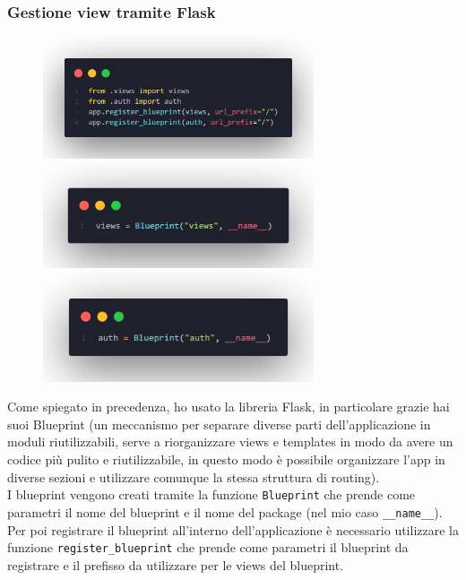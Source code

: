 \documentclass[12pt]{article}
\def\code#1{\texttt{#1}}
\begin{document}
\newpage

\subsubsection{Gestione view tramite Flask}

\begin{figure}
    \begin{minipage}{\linewidth}
        \includegraphics[width=8cm]{blueprints.png}
        \includegraphics[width=8cm]{bp-views.png}
        \includegraphics[width=8cm]{bp-auth.png}
    \end{minipage}
\end{figure}
\justifying
Come spiegato in precedenza, ho usato la libreria Flask, in particolare grazie hai suoi Blueprint (un meccanismo per separare diverse parti dell'applicazione in moduli riutilizzabili, serve a riorganizzare views e templates in modo da avere un codice più pulito e riutilizzabile, in questo modo è possibile organizzare l'app in diverse sezioni e utilizzare comunque la stessa struttura di routing). \\
I blueprint vengono creati tramite la funzione \code{Blueprint} che prende come parametri il nome del blueprint e il nome del package (nel mio caso \code{\_\_name\_\_}). Per poi registrare il blueprint all'interno dell'applicazione è necessario utilizzare la funzione \code{register\_blueprint} che prende come parametri il blueprint da registrare e il prefisso da utilizzare per le views del blueprint. \\
\end{document}
